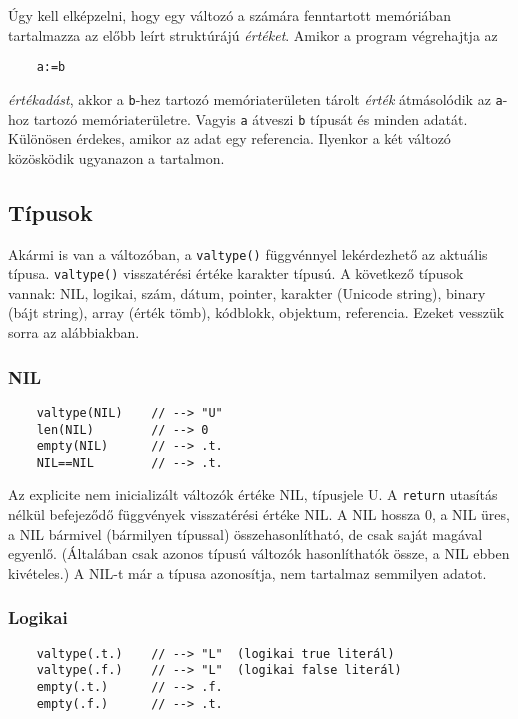 Úgy kell elképzelni, hogy egy változó a számára fenntartott memóriában
tartalmazza az előbb leírt struktúrájú {\em értéket}. Amikor a program
végrehajtja az 

\begin{verbatim}
    a:=b
\end{verbatim}
{\em értékadást}, akkor a \verb!b!-hez tartozó memóriaterületen tárolt {\em érték\/}
átmásolódik az \verb!a!-hoz tartozó memóriaterületre. Vagyis \verb!a! átveszi 
\verb!b! típusát és minden adatát.  Különösen érdekes, amikor az adat egy referencia.
Ilyenkor a két változó közösködik ugyanazon a tartalmon.


\subsection{Típusok}

Akármi is van a változóban,
a \verb!valtype()! függvénnyel lekérdezhető az aktuális típusa. 
\verb!valtype()! visszatérési értéke karakter típusú. 
A következő típusok vannak: 
NIL, logikai, szám, dátum, pointer, karakter (Unicode string),
binary (bájt string), array (érték tömb), kódblokk, objektum, referencia. 
Ezeket vesszük sorra az alábbiakban.


\subsubsection{NIL}
\begin{verbatim}
    valtype(NIL)    // --> "U"
    len(NIL)        // --> 0
    empty(NIL)      // --> .t.
    NIL==NIL        // --> .t.
\end{verbatim}

Az explicite nem inicializált változók értéke NIL, típusjele U.
A \verb!return! utasítás nélkül befejeződő függvények visszatérési
értéke NIL. A NIL hossza 0, a NIL üres, a NIL bármivel (bármilyen típussal)  
összehasonlítható, de csak saját magával egyenlő. (Általában
csak azonos típusú változók hasonlíthatók össze, a NIL ebben kivételes.)
A NIL-t már a típusa azonosítja, nem tartalmaz semmilyen adatot.


\subsubsection{Logikai}
\begin{verbatim}
    valtype(.t.)    // --> "L"  (logikai true literál)
    valtype(.f.)    // --> "L"  (logikai false literál)
    empty(.t.)      // --> .f.
    empty(.f.)      // --> .t.
\end{verbatim}

